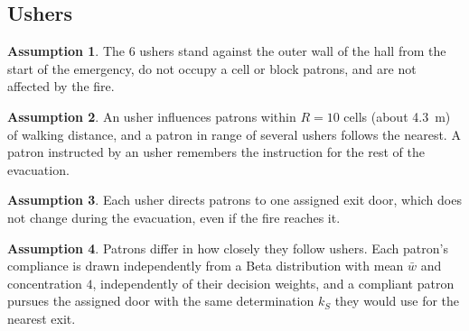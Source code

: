 \documentclass[14pt]{article}
\theoremstyle{definition}
\newtheorem{assumption}{Assumption}
\begin{document}
\subsection{Ushers}
\begin{assumption}\label{as:usher_position}
  The $6$ ushers stand against the outer wall of the hall from the start of the emergency, do not occupy a cell or block patrons, and are not affected by the fire.
\end{assumption}
\begin{assumption}\label{as:usher_range}
  An usher influences patrons within $R = 10$ cells (about \SI{4.3}{m}) of walking distance, and a patron in range of several ushers follows the nearest. A patron instructed by an usher remembers the instruction for the rest of the evacuation.
\end{assumption}
\begin{assumption}\label{as:usher_door}
  Each usher directs patrons to one assigned exit door, which does not change during the evacuation, even if the fire reaches it.
\end{assumption}
\begin{assumption}\label{as:compliance}
  Patrons differ in how closely they follow ushers. Each patron's compliance is drawn independently from a Beta distribution with mean $\bar w$ and concentration $4$, independently of their decision weights, and a compliant patron pursues the assigned door with the same determination $k_S$ they would use for the nearest exit.
\end{assumption}
\end{document}
